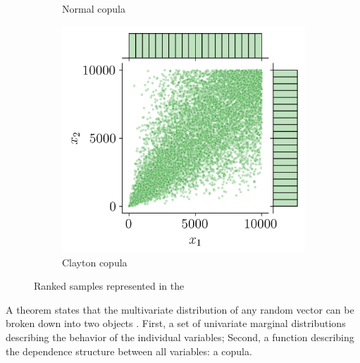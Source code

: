 \begin{figure}
\begin{subfigure}[b]{0.32\textwidth}
        \caption{Normal copula}
    \end{subfigure}
    \hfill
    \begin{subfigure}[b]{0.32\textwidth}
        \centering
        \includegraphics[width=\textwidth]{../numerical_experiments/chapter1/figures/clayton_copula_ranked.png}
        \caption{Clayton copula}
    \end{subfigure}
       \caption{Ranked samples represented in the }
       \label{fig:ranked_joint_dist_samples}
\end{figure}

A theorem states that the multivariate distribution of any random vector can be broken down into two objects \citep{joe_1997}. 
First, a set of univariate marginal distributions describing the behavior of the individual variables; 
Second, a function describing the dependence structure between all variables: a copula. 

